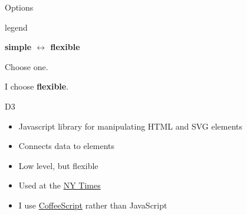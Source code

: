 \documentclass[final,plain]{beamer}
\newlength{\onecolwid}
\newcommand{\bi}{\begin{itemize}}
\newcommand{\ei}{\end{itemize}}
\newcommand{\bluebold}{\color{dblue} \bf}
\newcommand{\coltwovsep}{\vspace{23mm}}
\begin{document}
\begin{frame}[t]
\begin{columns}[t]
\begin{column}{\onecolwid}
\begin{block}{Options}
{    }

    \end{block}

  \coltwovsep %

        \begin{beamercolorbox}[sep=1em, wd=\onecolwid]{legend} \rmfamily

          \centerline{\bluebold \Large simple \quad
            $\longleftrightarrow$ \quad flexible}

           \vspace{48pt}

           \hfill \begin{minipage}{0.3\onecolwid}
            Choose one.

            I choose {\bluebold flexible}.
            \end{minipage}

        \end{beamercolorbox}

  \coltwovsep %

    \begin{block}{D3}{

       \bi \itemsep18pt
       \item Javascript library for manipulating HTML and SVG elements
       \item Connects data to elements
       \item Low level, but flexible
       \item Used at the \href{http://www.nytimes.com/pages/multimedia/index.html}{NY Times}
       \item I use \href{http://coffeescript.org}{CoffeeScript} rather than JavaScript
       \ei
    }
    \end{block}

  \coltwovsep %


\end{column}
\end{columns}
\end{frame}
\end{document}
